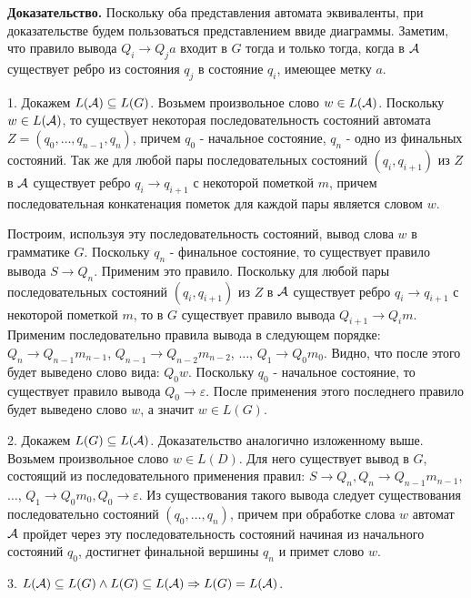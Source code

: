 \documentclass[10pt]{article}
\let \eps \varepsilon
\begin{document}
\smallskip

{\bf Доказательство.}
Поскольку оба представления автомата эквиваленты, при доказательстве будем пользоваться представлением ввиде диаграммы. Заметим, что правило вывода $Q_i \rightarrow Q_j a$ входит в $G$ тогда и только тогда, когда в ${\cal A}$ существует ребро из состояния $q_j$ в состояние $q_i$, имеющее метку $a$.

1. Докажем $L({\cal A}) \subseteq L(G)$. Возьмем произвольное слово $w \in L({\cal A})$. Поскольку $w \in L({\cal A})$, то существует некоторая последовательность состояний автомата $Z = (q_0, \dots, q_{n - 1}, q_n)$, причем $q_0$ - начальное состояние, $q_n$ - одно из финальных состояний. Так же для любой пары последовательных состояний $(q_i, q_{i + 1})$ из $Z$ в ${\cal A}$ существует ребро $q_i \rightarrow q_{i + 1}$ с некоторой пометкой $m$, причем последовательная конкатенация пометок для каждой пары является словом $w$.

Построим, используя эту последовательность состояний, вывод слова $w$ в грамматике $G$. Поскольку $q_n$ - финальное состояние, то существует правило вывода $S \rightarrow Q_n$. Применим это правило. Поскольку для любой пары последовательных состояний $(q_i, q_{i + 1})$ из $Z$ в ${\cal A}$ существует ребро $q_i \rightarrow q_{i + 1}$ с некоторой пометкой $m$, то в $G$ существует правило вывода $Q_{i + 1} \rightarrow Q_i m$. Применим последовательно правила вывода в следующем порядке: $Q_n \rightarrow Q_{n - 1} m_{n - 1}$, $Q_{n - 1} \rightarrow Q_{n - 2} m_{n - 2}$, $\dots$, $Q_1 \rightarrow Q_0 m_0$. Видно, что после этого будет выведено слово вида: $Q_0 w$. Поскольку $q_0$ - начальное состояние, то существует правило вывода $Q_0 \rightarrow \eps$. После применения этого последнего правило будет выведено слово $w$, а значит $w \in L(G)$.

2. Докажем $L(G) \subseteq L({\cal A})$. Доказательство аналогично изложенному выше. Возьмем произвольное слово $w \in L(D)$. Для него существует вывод в $G$, состоящий из последовательного применения правил: $S \rightarrow Q_n, Q_n \rightarrow Q_{n - 1} m_{n - 1}$, $\dots$, $Q_1 \rightarrow Q_0 m_0, Q_0 \rightarrow \eps$. Из существования такого вывода следует существования последовательно состояний $(q_0, \dots, q_n)$, причем при обработке слова $w$ автомат ${\cal A}$ пройдет через эту последовательность состояний начиная из начального состояний $q_0$, достигнет финальной вершины $q_n$ и примет слово $w$.

3. $L({\cal A}) \subseteq L(G) \wedge L(G) \subseteq L({\cal A}) \Rightarrow L(G) = L({\cal A})$.
\end{document}
